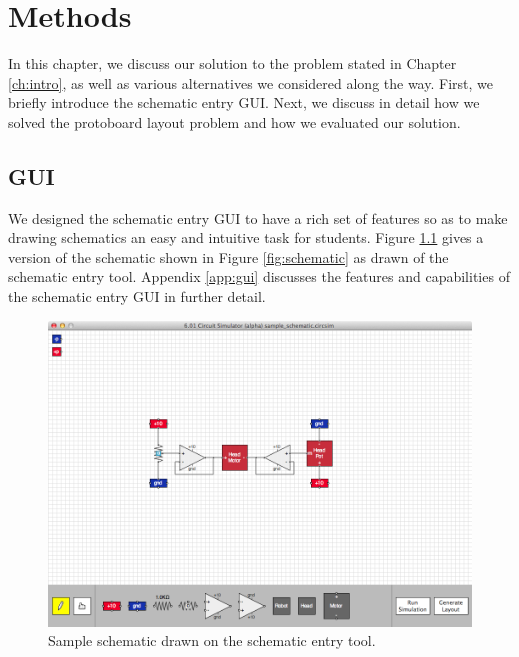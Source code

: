 
\chapter{Methods}
\label{ch:methods}

In this chapter, we discuss our solution to the problem stated in Chapter
\ref{ch:intro}, as well as various alternatives we considered along the way.
First, we briefly introduce the schematic entry GUI.
Next, we discuss in detail how we solved the protoboard layout problem and how
we evaluated our solution.

\section{GUI}

We designed the schematic entry GUI to have a rich set of features so as to make
drawing schematics an easy and intuitive task for students.
Figure \ref{fig:gui_example} gives a version of the schematic shown in Figure
\ref{fig:schematic} as drawn of the schematic entry tool. Appendix \ref{app:gui}
discusses the features and capabilities of the schematic entry GUI in
further detail.

\begin{figure}
\begin{center}
\includegraphics[width=\textwidth]{Images/gui_example.png}
\caption{Sample schematic drawn on the schematic entry tool.}
\label{fig:gui_example}
\end{center}
\end{figure}

